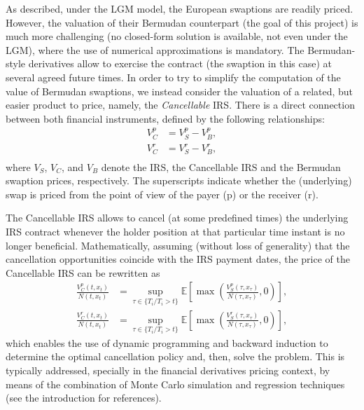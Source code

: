          As described, under the LGM model, the European swaptions are readily priced. However, the valuation of their Bermudan counterpart (the goal of this project) is much more challenging (no closed-form solution is available, not even under the LGM), where the use of numerical approximations is mandatory. The Bermudan-style derivatives allow to exercise the contract (the swaption in this case) at several agreed future times. In order to try to simplify the computation of the value of Bermudan swaptions, we instead consider the valuation of a related, but easier product to price, namely, the \emph{Cancellable} IRS. There is a direct connection between both financial instruments, defined by the following relationships:
        \begin{equation}\label{eq:IRS_Bermudan}
        \begin{aligned}
            V_C^{p} &= V_S^{p} - V_B^{p}, \\
            V_C^{r} &= V_S^{r} - V_B^{r}, \\
        \end{aligned}
        \end{equation}
        where $V_S$, $V_C$, and $V_B$ denote the IRS, the Cancellable IRS and the Bermudan swaption prices, respectively. The superscripts indicate whether the (underlying) swap is priced from the point of view of the payer (p) or the receiver (r). 
        
        The Cancellable IRS allows to cancel (at some predefined times) the underlying IRS contract whenever the holder position at that particular time instant is no longer beneficial. Mathematically, assuming (without loss of generality) that the cancellation opportunities coincide with the IRS payment dates, the price of the Cancellable IRS can be rewritten as
        \begin{equation}\label{eq:IRS_Cancellable}
        \begin{aligned}
            \frac{V_C^{p}(t,x_t)}{N(t,x_t)} &= \sup_{\tau \in 
            \{T_i/T_i>t\}} \mathbb{E} \left[\max\left(\frac{V_S^p(\tau, x_{\tau})}{N(\tau,x_\tau)}, 0\right) \right], \\
            \frac{V_C^{r}(t,x_t)}{N(t,x_t)} &= \sup_{\tau \in 
            \{T_i/T_i>t\}} \mathbb{E} \left[\max\left(\frac{V_S^r(\tau, x_{\tau})}{N(\tau,x_\tau)}, 0\right) \right],
        \end{aligned}
        \end{equation}
        which enables the use of dynamic programming and backward induction to determine the optimal cancellation policy and, then, solve the problem. This is typically addressed, specially in the financial derivatives pricing context, by means of the combination of Monte Carlo simulation and regression techniques (see the introduction for references).
            

